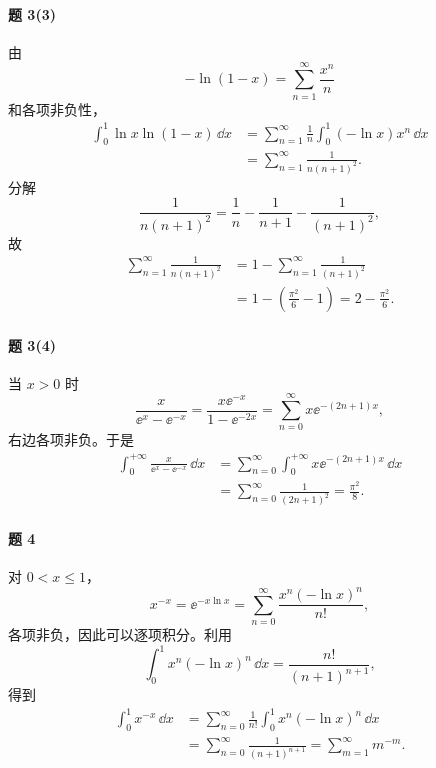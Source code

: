 \paragraph{题 3(3)}
\begin{xsolution}
由
\[
  -\ln(1-x)=\sum_{n=1}^{\infty}\frac{x^n}{n}
\]
和各项非负性，
\[
\begin{aligned}
  \int_0^1\ln x\ln(1-x)\,\dd x
  &=\sum_{n=1}^{\infty}\frac1n\int_0^1(-\ln x)x^n\,\dd x\\
  &=\sum_{n=1}^{\infty}\frac1{n(n+1)^2}.
\end{aligned}
\]
分解
\[
  \frac1{n(n+1)^2}=\frac1n-\frac1{n+1}-\frac1{(n+1)^2},
\]
故
\[
\begin{aligned}
  \sum_{n=1}^{\infty}\frac1{n(n+1)^2}
  &=1-\sum_{n=1}^{\infty}\frac1{(n+1)^2}\\
  &=1-\left(\frac{\pi^2}{6}-1\right)
  =2-\frac{\pi^2}{6}.
\end{aligned}
\]
\end{xsolution}

\paragraph{题 3(4)}
\begin{xsolution}
当 $x>0$ 时
\[
  \frac{x}{\ee^x-\ee^{-x}}
  =\frac{x\ee^{-x}}{1-\ee^{-2x}}
  =\sum_{n=0}^{\infty}x\ee^{-(2n+1)x},
\]
右边各项非负。于是
\[
\begin{aligned}
  \int_0^{+\infty}\frac{x}{\ee^x-\ee^{-x}}\,\dd x
  &=\sum_{n=0}^{\infty}\int_0^{+\infty}x\ee^{-(2n+1)x}\,\dd x\\
  &=\sum_{n=0}^{\infty}\frac1{(2n+1)^2}
  =\frac{\pi^2}{8}.
\end{aligned}
\]
\end{xsolution}

\paragraph{题 4}
\begin{xsolution}
对 $0<x\leqslant1$，
\[
  x^{-x}=\ee^{-x\ln x}
  =\sum_{n=0}^{\infty}\frac{x^n(-\ln x)^n}{n!},
\]
各项非负，因此可以逐项积分。利用
\[
  \int_0^1x^n(-\ln x)^n\,\dd x
  =\frac{n!}{(n+1)^{n+1}},
\]
得到
\[
\begin{aligned}
  \int_0^1x^{-x}\,\dd x
  &=\sum_{n=0}^{\infty}\frac1{n!}
    \int_0^1x^n(-\ln x)^n\,\dd x\\
  &=\sum_{n=0}^{\infty}\frac1{(n+1)^{n+1}}
  =\sum_{m=1}^{\infty}m^{-m}.
\end{aligned}
\]
\end{xsolution}

